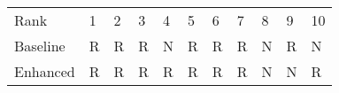 \begin{tabular}{lllllllllll}
Rank & 1 & 2 & 3 & 4 & 5 & 6 & 7 & 8 & 9 & 10 \\
Baseline & R & R & R & N & R & R & R & N & R & N \\
Enhanced & R & R & R & R & R & R & R & N & N & R \\
\end{tabular}

